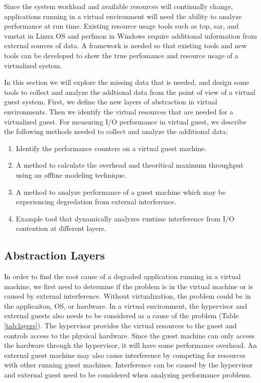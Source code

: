 Since the system workload and available resources will continually change, applications running in a virtual environment will need the ability to analyze performance at run time.  
Existing resource usage tools such as top, sar, and vmstat in Linux OS and perfmon in Windows require additional information from external sources of data.  
A framework is needed so that existing tools and new tools can be developed to show the true perfomance and resource usage of a virtualized system.

\indent  In this section we will explore the missing data that is needed, and design some tools to collect and analyze the addtional data from the point of view of a virtual guest system. 
First, we define the new layers of abstraction in virtual environments.  
Then we identify the virtual resources that are needed for a virtualized guest.
For measuring I/O performance in virtual guest, we describe the following methods needed to collect and analyze the additional data:
\begin {enumerate}
\item Identify the performance counters on a virtual guest machine.
\item A method to calculate the overhead and theoritical maximum throughput using an offline modeling technique.
\item A method to analyze performance of a guest machine which may be experiencing degredation from external interference.
\item Example tool that dynamically analyzes runtime interference from I/O contention at different layers.
\end{enumerate}

\subsection{Abstraction Layers}
In order to find the root cause of a degraded application running in a virtual machine, we first need to determine if the problem is in the virtual machine or is caused by external interference.  
Without virtualization, the problem could be in the applicaiton, OS, or hardware.  
In a virtual environment, the hypervisor and external guests also needs to be considered as a cause of the problem (Table \ref{tab:layers}).  
The hypervisor provides the virtual resources to the guest and controls access to the physical hardware.  
Since the guest machine can only access the hardware through the hypervisor, it will have some performance overhead. 
An external guest machine may also cause interference by competing for resources with other running guest machines.  
Interference can be caused by the hypervisor and external guest need to be considered when analyzing performance problems.

